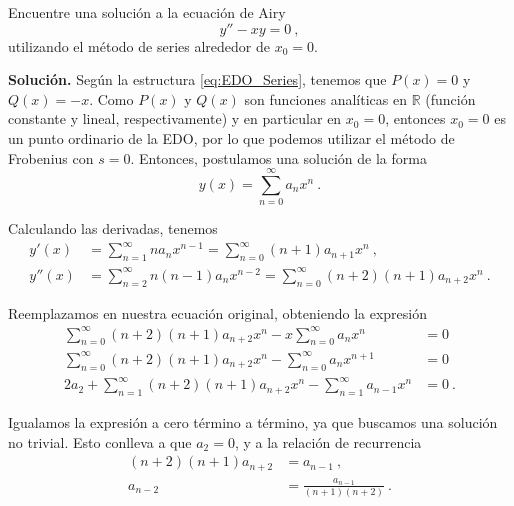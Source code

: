 \begin{ejemplo}
    Encuentre una solución a la ecuación de Airy
    \begin{equation}
        y'' - xy = 0 \ ,
    \end{equation}
    utilizando el método de series alrededor de $x_0 = 0$.

    \textbf{Solución.} Según la estructura \eqref{eq:EDO_Series}, tenemos que $P(x) = 0$ y $Q(x) = -x$. Como $P(x)$ y $Q(x)$ son funciones analíticas en $\mathbb{R}$ (función constante y lineal, respectivamente) y en particular en $x_0 = 0$, entonces $x_0 = 0$ es un punto ordinario de la EDO, por lo que podemos utilizar el método de Frobenius con $s=0$. Entonces, postulamos una solución de la forma
    \begin{equation}
        y(x) = \sum_{n=0}^\infty a_n x^n \ .
    \end{equation}

    Calculando las derivadas, tenemos
    \begin{align}
        y'(x)  & = \sum_{n=1}^\infty na_n x^{n-1} = \sum_{n=0}^\infty (n+1) a_{n+1} x^n \ , \\
        y''(x) & = \sum_{n=2}^\infty n(n-1) a_n x^{n-2} = \sum_{n=0}^\infty (n+2) (n+1) a_{n+2} x^n \ .
    \end{align}

    Reemplazamos en nuestra ecuación original, obteniendo la expresión 
    \begin{align}
        \sum_{n=0}^\infty (n+2) (n+1) a_{n+2} x^n - x \sum_{n=0}^\infty a_n x^n & = 0 \\
        \sum_{n=0}^\infty (n+2) (n+1) a_{n+2} x^n - \sum_{n=0}^\infty a_n x^{n+1} & = 0 \\
        2a_2 + \sum_{n=1}^\infty (n+2) (n+1) a_{n+2} x^n - \sum_{n=1}^\infty a_{n-1} x^{n} & = 0 \ .
    \end{align}

    Igualamos la expresión a cero término a término, ya que buscamos una solución no trivial. Esto conlleva a que $a_2 = 0$, y a la relación de recurrencia
    \begin{align}
        (n+2)(n+1) a_{n+2} & = a_{n-1} \ , \\
        a_{n-2} & = \frac{a_{n-1}}{(n+1)(n+2)} \ .
    \end{align}


\end{ejemplo}
